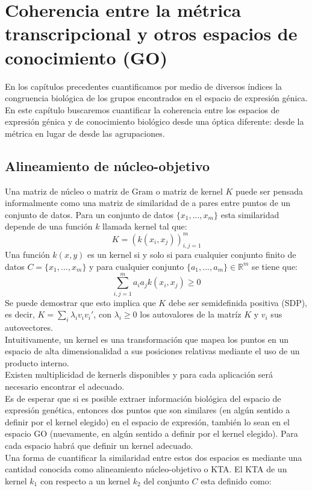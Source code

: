 \chapter{Coherencia entre la métrica transcripcional y otros espacios de conocimiento (GO)}
En los capítulos precedentes cuantificamos por medio de diversos índices la congruencia biológica de los grupos encontrados en el espacio de expresión génica. En este capítulo buscaremos cuantificar la coherencia entre los espacios de expresión génica y de conocimiento biológico desde una óptica diferente: desde la métrica en lugar de desde las agrupaciones.
\section{Alineamiento de núcleo-objetivo}
Una matriz de núcleo o matriz de Gram o matriz de kernel $K$ puede ser pensada informalmente como una matriz de similaridad de a pares entre puntos de un conjunto de datos. Para un conjunto de datos $\{x_1,...,x_m\}$ esta similaridad depende de una función $k$ llamada kernel tal que:
\begin{equation}
	K = (k(x_i, x_j))_{i,j=1}^m
\end{equation}
Una función $k(x, y)$ es un kernel si y solo si para cualquier conjunto finito de datos $C=\{x_1,...,x_m\}$ y para cualquier conjunto $\{a_1,...,a_m\} \in \mathbb{R}^m$ se tiene que:
\begin{equation}
	\sum_{i,j=1}^m a_ia_jk(x_i, x_j)\geq 0
\end{equation}
Se puede demostrar que esto implica que $K$ debe ser semidefinida positiva (SDP), es decir, $K=\sum_i \lambda _i v_i v_i'$, con $\lambda _i \geq 0$ los autovalores de la matríz $K$ y $v_i$ sus autovectores.\\
Intuitivamente, un kernel es una transformación que mapea los puntos en un espacio de alta dimensionalidad a sus posiciones relativas mediante el uso de un producto interno.\\
Existen multiplicidad de kernerls disponibles y para cada aplicación será necesario encontrar el adecuado.\\
Es de esperar que si es posible extraer información biológica del espacio de expresión genética, entonces dos puntos que son similares (en algún sentido a definir por el kernel elegido) en el espacio de expresión, también lo sean en el espacio GO (nuevamente, en algún sentido a definir por el kernel elegido). Para cada espacio habrá que definir un kernel adecuado.\\
Una forma de cuantificar la similaridad entre estos dos espacios es mediante una cantidad conocida como alineamiento núcleo-objetivo o KTA. El KTA de un kernel $k_1$ con respecto a un kernel $k_2$ del conjunto $C$ esta definido como:
